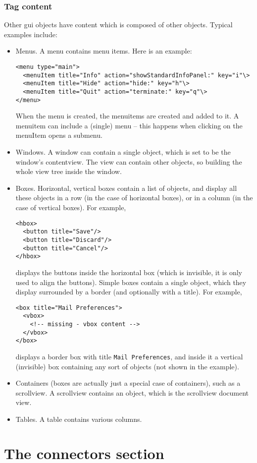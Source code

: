 \subsubsection{Tag content}
Other gui objects have content which is composed of other objects.
Typical examples include:
\begin{itemize}
\item Menus.  A menu contains menu items.  Here is an example:
\begin{verbatim}
<menu type="main">
  <menuItem title="Info" action="showStandardInfoPanel:" key="i"\>
  <menuItem title="Hide" action="hide:" key="h"\>
  <menuItem title="Quit" action="terminate:" key="q"\>
</menu>
\end{verbatim}
When the menu is created, the menuitems are created and added to it.
A menuitem can include a (single) menu -- this happens when clicking
on the menuItem opens a submenu.
\item Windows.  A window can contain a single object, which is set to be
the window's contentview.  The view can contain other objects, so 
building the whole view tree inside the window.
\item Boxes.  Horizontal, vertical boxes contain a list of objects, and display
all these objects in a row (in the case of horizontal boxes), or in a column
(in the case of vertical boxes).  For example,
\begin{verbatim}
<hbox>
  <button title="Save"/>
  <button title="Discard"/>
  <button title="Cancel"/>
</hbox>
\end{verbatim}
displays the buttons inside the horizontal box (which is invisible, it
is only used to align the buttons).  Simple boxes contain a single
object, which they display surrounded by a border (and optionally with
a title).  For example,
\begin{verbatim}
<box title="Mail Preferences">
  <vbox>
    <!-- missing - vbox content -->
  </vbox>
</box>
\end{verbatim}
displays a border box with title \texttt{Mail Preferences}, and inside it 
a vertical (invisible) box containing any sort of objects (not shown in the
example).
\item Containers (boxes are actually just a special case of containers), such
as a scrollview.  A scrollview contains an object, which is the
scrollview document view.
\item Tables.  A table contains various columns.
\end{itemize}

\section{The connectors section}

